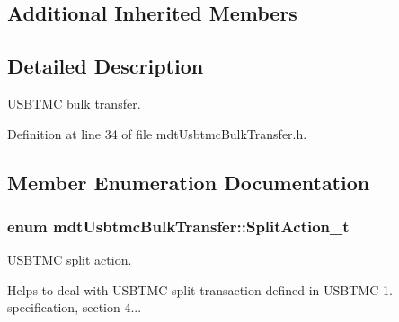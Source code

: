 \subsection*{Additional Inherited Members}


\subsection{Detailed Description}
U\-S\-B\-T\-M\-C bulk transfer. 

Definition at line 34 of file mdt\-Usbtmc\-Bulk\-Transfer.\-h.



\subsection{Member Enumeration Documentation}
\hypertarget{classmdt_usbtmc_bulk_transfer_a81f2309d821053cd7c8f6e32aff93b7c}{
\subsubsection[{Split\-Action\-\_\-t}]{\setlength{\rightskip}{0pt plus 5cm}enum {\bf mdt\-Usbtmc\-Bulk\-Transfer\-::\-Split\-Action\-\_\-t}\hspace{0.3cm}{\ttfamily [strong]}}}\label{classmdt_usbtmc_bulk_transfer_a81f2309d821053cd7c8f6e32aff93b7c}


U\-S\-B\-T\-M\-C split action. 

Helps to deal with U\-S\-B\-T\-M\-C split transaction defined in U\-S\-B\-T\-M\-C 1. specification, section 4...

